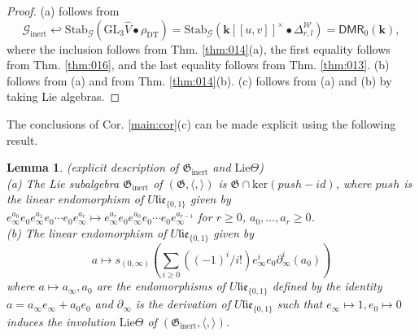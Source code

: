 \documentclass[10pt]{amsart}
\newtheorem{lem}[thm]{Lemma}
\numberwithin{equation}{subsection}
\begin{document}
\begin{proof}
(a) follows from 
$$
\mathcal G_{\mathrm{inert}}\hookleftarrow
\mathrm{Stab}_{\mathcal G}(\mathrm{GL}_3\hat V\bullet \rho_{\mathrm{DT}})
=\mathrm{Stab}_{\mathcal G}(\mathbf k[[u,v]]^\times\bullet\Delta^{\mathcal W}_{r,l})
=\mathsf{DMR}_0(\mathbf k), 
$$
where the inclusion follows from Thm. \ref{thm:014}(a), 
the first equality follows from Thm. \ref{thm:016}, and the last
equality follows from Thm. \ref{thm:013}. 
(b) follows from (a) and from Thm. \ref{thm:014}(b). 
(c) follows from (a) and (b) by taking Lie algebras.  
\end{proof}

The conclusions of Cor. \ref{main:cor}(c) can be made explicit using the following result.  

\begin{lem} (explicit description of 
$\mathfrak G_{\mathrm{inert}}$ and $\mathrm{Lie}\Theta$)
\\
 (a) The Lie subalgebra $\mathfrak G_{\mathrm{inert}}$ of $(\mathfrak G,\langle,\rangle)$ is 
 $\mathfrak G\cap\mathrm{ker}(push-id)$, where $push$ is the linear endomorphism of $U\mathfrak{lie}_{\{0,1\}}$ 
 given by $e_\infty^{a_0}e_0e_\infty^{a_1}e_0\cdots e_0e_\infty^{a_r}\mapsto 
 e_\infty^{a_r}e_0e_\infty^{a_0}e_0\cdots e_0e_\infty^{a_{r-1}}$ for $r\geq0$,
 $a_0,\ldots,a_r\geq0$. 
\\
(b) The linear endomorphism of $U\mathfrak{lie}_{\{0,1\}}$ given by 
$$%
\textstyle a\mapsto s_{(0,\infty)}(\sum_{i\geq0}((-1)^i/i!)e_\infty^ie_0\partial_\infty^i(a_0))  
$$%
where $a\mapsto a_\infty,a_0$ are the endomorphisms of 
$U\mathfrak{lie}_{\{0,1\}}$ defined by the identity 
$a=a_\infty e_\infty+a_0e_0$ and $\partial_\infty$ is the derivation of $U\mathfrak{lie}_{\{0,1\}}$ such that 
$e_\infty\mapsto 1,e_0\mapsto 0$ induces 
the involution $\mathrm{Lie}\Theta$ of $(\mathfrak G_{\mathrm{inert}},\langle,\rangle)$. 
\\
\end{lem}
\end{document}

